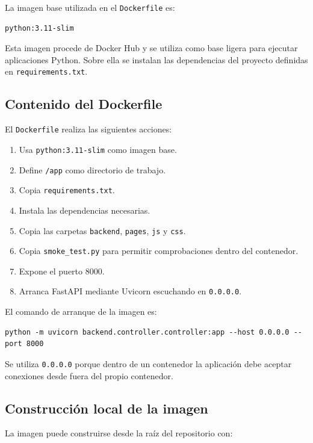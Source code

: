 \documentclass[11pt,a4paper]{article}
\begin{document}
La imagen base utilizada en el \texttt{Dockerfile} es:

\begin{verbatim}
python:3.11-slim
\end{verbatim}

Esta imagen procede de Docker Hub y se utiliza como base ligera para ejecutar aplicaciones Python. Sobre ella se instalan las dependencias del proyecto definidas en \texttt{requirements.txt}.

\subsection{Contenido del Dockerfile}

El \texttt{Dockerfile} realiza las siguientes acciones:

\begin{enumerate}
  \item Usa \texttt{python:3.11-slim} como imagen base.
  \item Define \texttt{/app} como directorio de trabajo.
  \item Copia \texttt{requirements.txt}.
  \item Instala las dependencias necesarias.
  \item Copia las carpetas \texttt{backend}, \texttt{pages}, \texttt{js} y \texttt{css}.
  \item Copia \texttt{smoke\_test.py} para permitir comprobaciones dentro del contenedor.
  \item Expone el puerto 8000.
  \item Arranca FastAPI mediante Uvicorn escuchando en \texttt{0.0.0.0}.
\end{enumerate}

El comando de arranque de la imagen es:

\begin{verbatim}
python -m uvicorn backend.controller.controller:app --host 0.0.0.0 --port 8000
\end{verbatim}

Se utiliza \texttt{0.0.0.0} porque dentro de un contenedor la aplicaci\'on debe aceptar conexiones desde fuera del propio contenedor.

\subsection{Construcci\'on local de la imagen}

La imagen puede construirse desde la ra\'iz del repositorio con:
\end{document}
